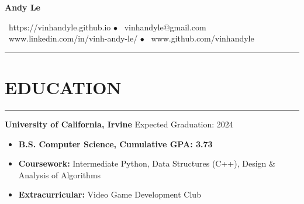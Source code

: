 \documentclass{article}
\begin{document}
   \begin{center}
      \Huge\textbf{Andy Le}\\
      \vspace{3pt}

      \normalsize{\faHome\ https://vinhandyle.github.io} $\bullet$
      \normalsize{\faEnvelope\ vinhandyle@gmail.com}\\

      \vspace{3pt}
      \normalsize{\faLinkedinSquare\ www.linkedin.com/in/vinh-andy-le/} $\bullet$
      \normalsize{\faGithubSquare\ www.github.com/vinhandyle}
   \end{center}
\vspace{-5pt} \hrule \vspace{-5pt}

\section*{EDUCATION} \vspace{-6pt} \hrule \vspace{6pt}
\textbf{University of California, Irvine} \hfill Expected Graduation: 2024
\begin{itemize}
	\item\vspace{-6pt} \textbf{B.S. Computer Science, Cumulative GPA: 3.73}
	\item\vspace{-6pt}\textbf{Coursework:} Intermediate Python, Data Structures (C++), Design \& Analysis of Algorithms
	\item\vspace{-6pt}\textbf{Extracurricular:} Video Game Development Club
\end{itemize}
\vspace{-20pt}
\end{document}
